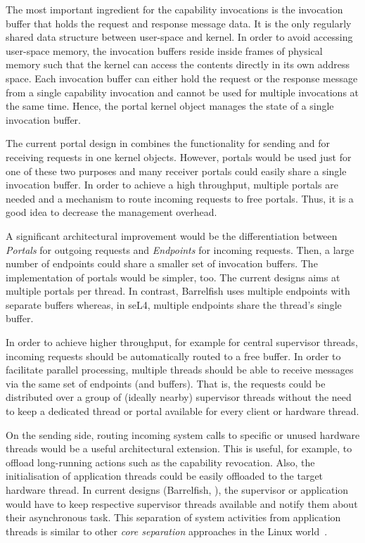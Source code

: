 The most important ingredient for the capability invocations is the invocation buffer that holds the request and response message data. It is the only regularly shared data structure between user-space and kernel. In order to avoid accessing user-space memory, the invocation buffers reside inside frames of physical memory such that the kernel can access the contents directly in its own address space. Each invocation buffer can either hold the request or the response message from a single capability invocation and cannot be used for multiple invocations at the same time. Hence, the portal kernel object manages the state of a single invocation buffer. 

The current portal design in \mythos combines the functionality for sending and for receiving requests in one kernel objects. However, portals would be used just for one of these two purposes and many receiver portals could easily share a single invocation buffer. In order to achieve a high throughput, multiple portals are needed and a mechanism to route incoming requests to free portals. Thus, it is a good idea to decrease the management overhead.

A significant architectural improvement would be the differentiation between \emph{Portals} for outgoing requests and \emph{Endpoints} for incoming requests. Then, a large number of endpoints could share a smaller set of invocation buffers. The implementation of portals would be simpler, too. The current \mythos designs aims at multiple portals per thread. In contrast, Barrelfish uses multiple endpoints with separate buffers whereas, in seL4, multiple endpoints share the thread's single buffer.

In order to achieve higher throughput, for example for central supervisor threads, incoming requests should be automatically routed to a free buffer. In order to facilitate parallel processing, multiple threads should be able to receive messages via the same set of endpoints (and buffers). That is, the requests could be distributed over a group of (ideally nearby) supervisor threads without the need to keep a dedicated thread or portal available for every client or hardware thread.

On the sending side, routing incoming system calls to specific or unused hardware threads would be a useful architectural extension. This is useful, for example, to offload long-running actions such as the capability revocation. Also, the initialisation of application threads could be easily offloaded to the target hardware thread. In current designs (Barrelfish, \mythos), the supervisor or application would have to keep respective supervisor threads available and notify them about their asynchronous task. This separation of system activities from application threads is similar to other \emph{core separation} approaches in the Linux world~\cite{rosenthal2013mitigating,6012829}.

